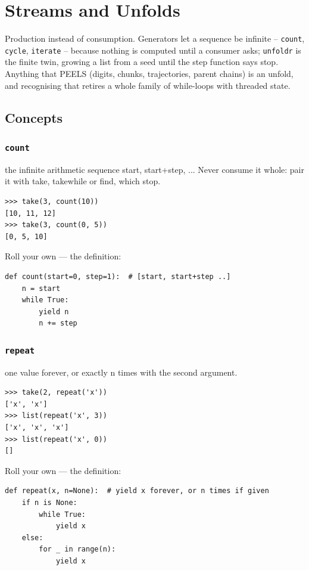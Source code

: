 \documentclass[10pt,letterpaper]{book}
\begin{document}
\chapter{Streams and Unfolds}

Production instead of consumption. Generators let a sequence be infinite --
\texttt{count}, \texttt{cycle}, \texttt{iterate} -- because nothing is
computed until a consumer asks; \texttt{unfoldr} is the finite twin, growing
a list from a seed until the step function says stop. Anything that PEELS
(digits, chunks, trajectories, parent chains) is an unfold, and recognising
that retires a whole family of while-loops with threaded state.
\section{Concepts}
\subsection{\texttt{count}}\label{def:count}
the infinite arithmetic sequence start, start+step, ... Never consume it whole: pair it with take, takewhile or find, which stop.
\begin{lstlisting}[style=ex]
>>> take(3, count(10))
[10, 11, 12]
>>> take(3, count(0, 5))
[0, 5, 10]
\end{lstlisting}

Roll your own --- the definition:

\begin{lstlisting}[style=ex]
def count(start=0, step=1):  # [start, start+step ..]
    n = start
    while True:
        yield n
        n += step
\end{lstlisting}

\subsection{\texttt{repeat}}\label{def:repeat}
one value forever, or exactly n times with the second argument.
\begin{lstlisting}[style=ex]
>>> take(2, repeat('x'))
['x', 'x']
>>> list(repeat('x', 3))
['x', 'x', 'x']
>>> list(repeat('x', 0))
[]
\end{lstlisting}

Roll your own --- the definition:

\begin{lstlisting}[style=ex]
def repeat(x, n=None):  # yield x forever, or n times if given
    if n is None:
        while True:
            yield x
    else:
        for _ in range(n):
            yield x
\end{lstlisting}
\end{document}
